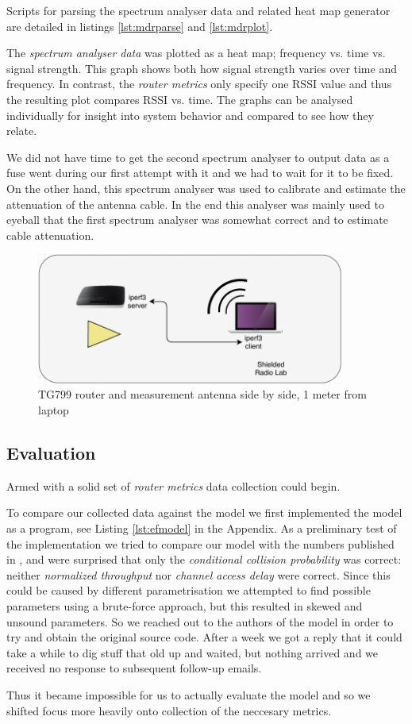 Scripts for parsing the spectrum analyser data and related heat map generator
are detailed in listings \ref{lst:mdrparse} and \ref{lst:mdrplot}.

The \emph{spectrum analyser data} was plotted as a heat map; frequency vs. time
vs. signal strength. This graph shows both how signal strength varies over time
and frequency. In contrast, the \emph{router metrics} only specify one RSSI
value and thus the resulting plot compares RSSI vs. time. The graphs can be
analysed individually for insight into system behavior and compared to see how
they relate.

We did not have time to get the second spectrum analyser to output data as a
fuse went during our first attempt with it and we had to wait for it to be
fixed. On the other hand, this spectrum analyser was used to calibrate and
estimate the attenuation of the antenna cable. In the end this analyser was
mainly used to eyeball that the first spectrum analyser was somewhat correct
and to estimate cable attenuation.

\begin{figure}
\center
\includegraphics[width=0.9\textwidth]{images/rssi-exp.pdf}
\caption{TG799 router and measurement antenna side by side, 1 meter from laptop}
\label{fig:rssi_setup}
\end{figure}

\subsection{Evaluation}

Armed with a solid set of \emph{router metrics} data collection could begin.

To compare our collected data against the model we first implemented the model
as a program, see Listing \ref{lst:efmodel} in the Appendix. As a preliminary
test of the implementation we tried to compare our model with the numbers
published in \cite{felemban}, and were surprised that only the
\emph{conditional collision probability} was correct: neither \emph{normalized
throughput} nor \emph{channel access delay} were correct. Since this could be
caused by different parametrisation we attempted to find possible parameters
using a brute-force approach, but this resulted in skewed and unsound
parameters. So we reached out to the authors of the model in order to try and
obtain the original source code. After a week we got a reply that it could
take a while to dig stuff that old up and waited, but nothing arrived and we
received no response to subsequent follow-up emails.

Thus it became impossible for us to actually evaluate the model and so we
shifted focus more heavily onto collection of the neccesary metrics. 

